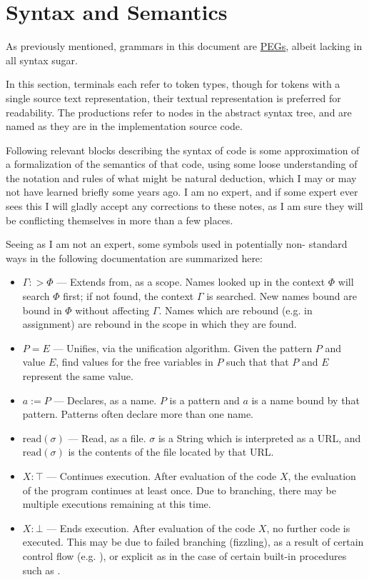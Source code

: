 \section{Syntax and Semantics}
\label{sec:syntax}

As previously mentioned, grammars in this document are
\href{https://en.wikipedia.org/wiki/Parsing_expression_grammar}{PEGs},
albeit lacking in all syntax sugar.

In this section, terminals each refer to token types, though for tokens
with a single source text representation, their textual representation
is preferred for readability. The productions refer to nodes in the
abstract syntax tree, and are named as they are in the implementation
source code.

Following relevant blocks describing the syntax of \Trilogy{} code is some
approximation of a formalization of the semantics of that code, using some
loose understanding of the notation and rules of what might be natural
deduction, which I may or may not have learned briefly some years ago.
I am no expert, and if some expert ever sees this I will gladly accept any
corrections to these notes, as I am sure they will be conflicting themselves
in more than a few places.

Seeing as I am not an expert, some symbols used in potentially non-
standard ways in the following documentation are summarized here:

\begin{itemize}
    \item $\Gamma :> \Phi$ --- Extends from, as a scope. Names looked up in the
    context $\Phi$ will search $\Phi$ first; if not found, the context $\Gamma$
    is searched. New names bound are bound in $\Phi$ without affecting $\Gamma$.
    Names which are rebound (e.g. in assignment) are rebound in the scope in
    which they are found.
    \item $P = E$ --- Unifies, via the unification algorithm. Given the pattern
    $P$ and value $E$, find values for the free variables in $P$ such that
    that $P$ and $E$ represent the same value.
    \item $a := P$ --- Declares, as a name. $P$ is a pattern and $a$ is a name
    bound by that pattern. Patterns often declare more than one name.
    \item $\text{read}(\sigma)$ --- Read, as a file. $\sigma$ is a String which is interpreted
    as a URL, and $\text{read}(\sigma)$ is the contents of the file located by that URL.
    \item $X : \top$ --- Continues execution. After evaluation of the code $X$,
    the evaluation of the program continues at least once. Due to branching, there
    may be multiple executions remaining at this time.
    \item $X : \bot$ --- Ends execution. After evaluation of the code $X$,
    no further code is executed. This may be due to failed branching (fizzling),
    as a result of certain control flow (e.g. ), or explicit as in the
    case of certain built-in procedures such as .
\end{itemize}

